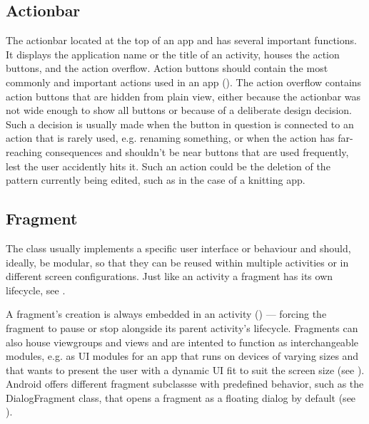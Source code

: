 \subsection{Actionbar}
The actionbar located at the top of an app and has several important functions. It displays the application name or the title of an activity, houses the action buttons, and the action overflow. Action buttons should contain the most commonly and important actions used in an app (\cite{actionbar}). The action overflow contains action buttons that are hidden from plain view, either because the actionbar was not wide enough to show all buttons or because of a deliberate design decision. Such a decision is usually made when the button in question is connected to an action that is rarely used, e.g. renaming something, or when the action has far-reaching consequences and shouldn't be near buttons that are used frequently, lest the user accidently hits it. Such an action could be the deletion of the pattern currently being edited, such as in the case of a knitting app. 

\subsection{Fragment}
The  class usually implements a specific user interface or behaviour and should, ideally, be modular, so that they can be reused within multiple activities or in different screen configurations. Just like an activity a fragment has its own lifecycle, see .

A fragment's creation is always embedded in an activity (\cite{androidfragment}) --- forcing the fragment to pause or stop alongside its parent activity's lifecycle. Fragments can also house viewgroups and views and are intented to function as interchangeable modules, e.g. as \gls{UI} modules for an app that runs on devices of varying sizes and that wants to present the user with a dynamic \gls{UI} fit to suit the screen size (see ). Android offers different fragment subclassse with predefined behavior, such as the DialogFragment class, that opens a fragment as a floating dialog by default (see ).

